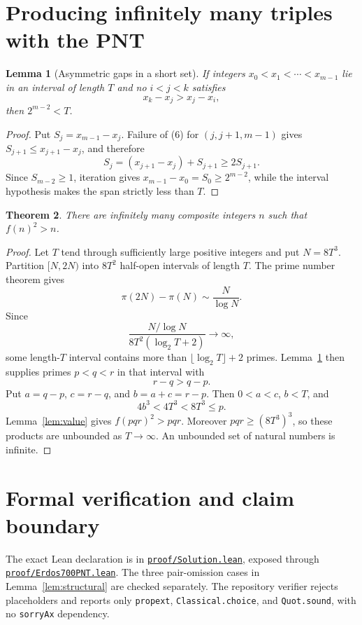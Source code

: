 \documentclass[11pt]{article}
\newtheorem{theorem}{Theorem}
\newtheorem{lemma}[theorem]{Lemma}
\begin{document}
\section{Producing infinitely many triples with the PNT}

\begin{lemma}[Asymmetric gaps in a short set]\label{lem:gaps}
If integers
$x_0<x_1<\cdots<x_{m-1}$ lie in an interval of length $T$ and no
$i<j<k$ satisfies
\[
 x_k-x_j>x_j-x_i,                                          \tag{6}
\]
then $2^{m-2}<T$.
\end{lemma}

\begin{proof}
Put $S_j=x_{m-1}-x_j$.  Failure of (6) for $(j,j+1,m-1)$ gives
$S_{j+1}\leq x_{j+1}-x_j$, and therefore
\[
 S_j=(x_{j+1}-x_j)+S_{j+1}\geq2S_{j+1}.
\]
Since $S_{m-2}\geq1$, iteration gives
$x_{m-1}-x_0=S_0\geq2^{m-2}$, while the interval hypothesis makes the span
strictly less than $T$.
\end{proof}

\begin{theorem}\label{thm:main}
There are infinitely many composite integers $n$ such that $f(n)^2>n$.
\end{theorem}

\begin{proof}
Let $T$ tend through sufficiently large positive integers and put
$N=8T^3$.  Partition $[N,2N)$ into $8T^2$ half-open intervals of length
$T$.  The prime number theorem gives
\[
 \pi(2N)-\pi(N)\sim\frac{N}{\log N}.
\]
Since
\[
 \frac{N/\log N}{8T^2(\log_2T+2)}\longrightarrow\infty,
\]
some length-$T$ interval contains more than
$\lfloor\log_2T\rfloor+2$ primes.  Lemma~\ref{lem:gaps} then supplies
primes $p<q<r$ in that interval with
\[
 r-q>q-p.
\]
Put $a=q-p$, $c=r-q$, and $b=a+c=r-p$.  Then $0<a<c$, $b<T$, and
\[
 4b^3<4T^3<8T^3\leq p.
\]
Lemma~\ref{lem:value} gives $f(pqr)^2>pqr$.  Moreover $pqr\geq(8T^3)^3$,
so these products are unbounded as $T\to\infty$.  An unbounded set of
natural numbers is infinite.
\end{proof}

\section{Formal verification and claim boundary}

The exact Lean declaration is
 in
\href{https://github.com/gakonst/nanocodex-erdos700/blob/main/proof/Solution.lean}
{\texttt{proof/Solution.lean}}, exposed through
\href{https://github.com/gakonst/nanocodex-erdos700/blob/main/proof/Erdos700PNT.lean}
{\texttt{proof/Erdos700PNT.lean}}.  The three pair-omission cases in
Lemma~\ref{lem:structural} are checked separately.  The repository verifier
rejects placeholders and reports only \texttt{propext},
\texttt{Classical.choice}, and \texttt{Quot.sound}, with no
\texttt{sorryAx} dependency.
\end{document}
